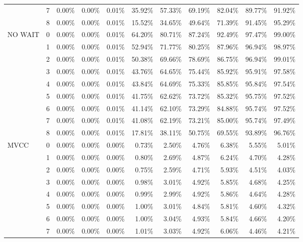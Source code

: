 \begin{tabular}{llrrrrrrrrr}
       & 7 & 0.00\% & 0.00\% & 0.01\% & 35.92\% & 57.33\% & 69.19\% & 82.04\% & 89.77\% & 91.92\% \\
       & 8 & 0.00\% & 0.00\% & 0.01\% & 15.52\% & 34.65\% & 49.64\% & 71.39\% & 91.45\% & 95.29\% \\
NO WAIT & 0 & 0.00\% & 0.00\% & 0.01\% & 64.20\% & 80.71\% & 87.24\% & 92.49\% & 97.47\% & 99.00\% \\
       & 1 & 0.00\% & 0.00\% & 0.01\% & 52.94\% & 71.77\% & 80.25\% & 87.96\% & 96.94\% & 98.97\% \\
       & 2 & 0.00\% & 0.00\% & 0.01\% & 50.38\% & 69.66\% & 78.69\% & 86.75\% & 96.94\% & 99.01\% \\
       & 3 & 0.00\% & 0.00\% & 0.01\% & 43.76\% & 64.65\% & 75.44\% & 85.92\% & 95.91\% & 97.58\% \\
       & 4 & 0.00\% & 0.00\% & 0.01\% & 43.84\% & 64.69\% & 75.33\% & 85.85\% & 95.84\% & 97.54\% \\
       & 5 & 0.00\% & 0.00\% & 0.01\% & 41.75\% & 62.62\% & 73.72\% & 85.32\% & 95.75\% & 97.52\% \\
       & 6 & 0.00\% & 0.00\% & 0.01\% & 41.14\% & 62.10\% & 73.29\% & 84.88\% & 95.74\% & 97.52\% \\
       & 7 & 0.00\% & 0.00\% & 0.01\% & 41.08\% & 62.19\% & 73.21\% & 85.00\% & 95.74\% & 97.49\% \\
       & 8 & 0.00\% & 0.00\% & 0.01\% & 17.81\% & 38.11\% & 50.75\% & 69.55\% & 93.89\% & 96.76\% \\
MVCC & 0 & 0.00\% & 0.00\% & 0.00\% &  0.73\% &  2.50\% &  4.76\% &  6.38\% &  5.55\% &  5.01\% \\
       & 1 & 0.00\% & 0.00\% & 0.00\% &  0.80\% &  2.69\% &  4.87\% &  6.24\% &  4.70\% &  4.28\% \\
       & 2 & 0.00\% & 0.00\% & 0.00\% &  0.75\% &  2.59\% &  4.71\% &  5.93\% &  4.51\% &  4.03\% \\
       & 3 & 0.00\% & 0.00\% & 0.00\% &  0.98\% &  3.01\% &  4.92\% &  5.85\% &  4.68\% &  4.25\% \\
       & 4 & 0.00\% & 0.00\% & 0.00\% &  0.99\% &  2.99\% &  4.92\% &  5.86\% &  4.64\% &  4.28\% \\
       & 5 & 0.00\% & 0.00\% & 0.00\% &  1.00\% &  3.01\% &  4.84\% &  5.81\% &  4.60\% &  4.32\% \\
       & 6 & 0.00\% & 0.00\% & 0.00\% &  1.00\% &  3.04\% &  4.93\% &  5.84\% &  4.66\% &  4.20\% \\
       & 7 & 0.00\% & 0.00\% & 0.00\% &  1.01\% &  3.03\% &  4.92\% &  6.06\% &  4.46\% &  4.21\% \\

\end{tabular}

